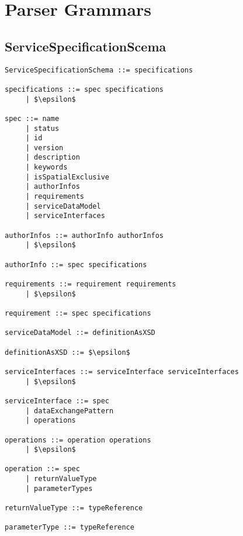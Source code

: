 \section{Parser Grammars}

\subsection{ServiceSpecificationScema}
\begin{lstlisting}[mathescape=true]
ServiceSpecificationSchema ::= specifications

specifications ::= spec specifications
     | $\epsilon$
     
spec ::= name
     | status
     | id
     | version
     | description
     | keywords
     | isSpatialExclusive
     | authorInfos
     | requirements
     | serviceDataModel
     | serviceInterfaces
     
authorInfos ::= authorInfo authorInfos
     | $\epsilon$

authorInfo ::= spec specifications

requirements ::= requirement requirements
     | $\epsilon$

requirement ::= spec specifications

serviceDataModel ::= definitionAsXSD

definitionAsXSD ::= $\epsilon$

serviceInterfaces ::= serviceInterface serviceInterfaces
     | $\epsilon$

serviceInterface ::= spec
     | dataExchangePattern
     | operations

operations ::= operation operations
     | $\epsilon$

operation ::= spec
     | returnValueType
     | parameterTypes

returnValueType ::= typeReference

parameterType ::= typeReference

\end{lstlisting}

